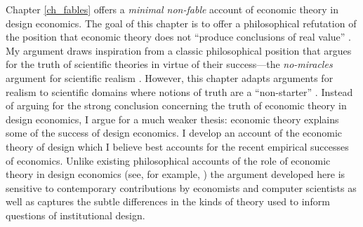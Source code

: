 Chapter \ref{ch_fables} offers a \textit{minimal non-fable} account of economic theory in design economics. The goal of this chapter is to offer a philosophical refutation of the position that economic theory does not ``produce conclusions of real value'' \autocite[37]{rubinstein2012}. My argument draws inspiration from a classic philosophical position that argues for the truth of scientific theories in virtue of their success---the \textit{no-miracles} argument for scientific realism \autocite{putnam1975}. However, this chapter adapts arguments for realism to scientific domains where notions of truth are a ``non-starter'' \autocite[328]{alexandrova2009}. Instead of arguing for the strong conclusion concerning the truth of economic theory in design economics, I argue for a much weaker thesis: economic theory explains some of the success of design economics. I develop an account of the economic theory of design which I believe best accounts for the recent empirical successes of economics. Unlike existing philosophical accounts of the role of economic theory in design economics (see, for example, \cite{alexandrova2009, ross2008}) the argument developed here is sensitive to contemporary contributions by economists and computer scientists as well as captures the subtle differences in the kinds of theory used to inform questions of institutional design.


